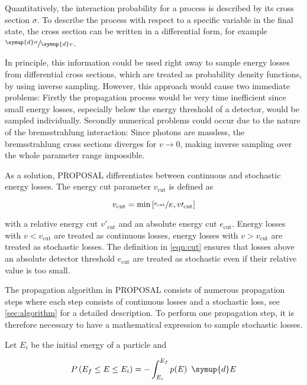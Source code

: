 Quantitatively, the interaction probability for a process is described by its cross section $\sigma$.
To describe the process with respect to a specific variable in the final state, the cross section can be written in a differential form, for example $\sfrac{\symup{d}\sigma}{\symup{d}v}$.

In principle, this information could be used right away to sample energy losses from differential cross sections, which are treated as probability density functions, by using inverse sampling.
However, this approach would cause two immediate problems:
Firstly the propagation process would be very time inefficient since small energy losses, especially below the energy threshold of a detector, would be sampled individually.
Secondly numerical problems could occur due to the nature of the bremsstrahlung interaction:
Since photons are massless, the bremsstrahlung cross sections diverges for $v \to 0$, making inverse sampling over the whole parameter range impossible.

As a solution, PROPOSAL differentiates between continuous and stochastic energy losses.
The energy cut parameter $v_\text{cut}$ is defined as

\begin{equation}
	\label{eqn:cut}
	v_\text{cut} = \text{min}\left[\sfrac{e_\text{cut}}{E}, v\prime_\text{cut} \right]
\end{equation}

with a relative energy cut $v\prime_\text{cut}$ and an absolute energy cut $e_\text{cut}$.
Energy losses with $v < v_\text{cut}$ are treated as continuous losses, energy losses with $v > v_\text{cut}$ are treated as stochastic losses.
The definition in \ref{eqn:cut} ensures that losses above an absolute detector threshold $e_\text{cut}$ are treated as stochastic even if their relative value is too small.

The propagation algorithm in PROPOSAL consists of numerous propagation steps where each step consists of continuous losses and a stochastic loss, see \ref{sec:algorithm} for a detailed description.
To perform one propagation step, it is therefore necessary to have a mathematical expression to sample stochastic losses.

Let $E_i$ be the initial energy of a particle and

\begin{equation}
	\label{eqn:cum}
	P\left(E_f \leq E \leq E_i\right) = - \int_{E_i}^{E_f} p(E) \, \symup{d}E
\end{equation}

